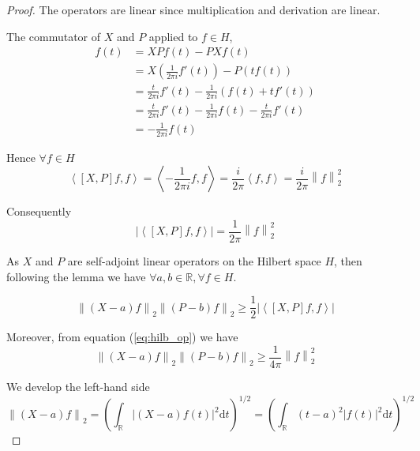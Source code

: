 \documentclass[
  american,
]{article}
\begin{document}
\begin{proof}
The operators are linear since multiplication and derivation are linear.

The commutator of \(X\) and \(P\) applied to \(f\in H\),
\begin{align*}
[X,P]f(t) &= XPf(t) - PXf(t)\\
    &= X\left(\frac{1}{2\pi i}f'(t)\right) - P\left(tf(t)\right)\\
    &= \frac{t}{2\pi i}f'(t) - \frac{1}{2\pi i}\left(f(t) + tf'(t)\right)\\
    &= \frac{t}{2\pi i}f'(t) - \frac{1}{2\pi i}f(t) - \frac{t}{2\pi i}f'(t)\\
    &= -\frac{1}{2\pi i}f(t)
\end{align*}

Hence \(\forall f\in H\)
\begin{equation}
\left\langle[X,P]f,f\right\rangle = \left\langle-\frac{1}{2\pi i}f,f\right\rangle = \frac{i}{2\pi}\left\langle f,f\right\rangle
= \frac{i}{2\pi}\left\lVert f\right\rVert_2^2
\end{equation}

Consequently
\begin{equation}\label{eq:hilb_op}
\left\lvert\left\langle[X,P]f,f\right\rangle\right\rvert = \frac{1}{2\pi}\left\lVert f\right\rVert_2^2
\end{equation}

As \(X\) and \(P\) are self-adjoint linear operators on the Hilbert space \(H\),
then following the lemma we have \(\forall a,b\in\mathbb{R},\forall f\in H\).

\begin{equation}
\left\lVert(X-a)f\right\rVert_2 \left\lVert(P-b)f\right\rVert_2 \geq \frac{1}{2}\left\lvert\left\langle[X,P]f,f\right\rangle\right\rvert
\end{equation}

Moreover, from equation (\ref{eq:hilb_op}) we have
\begin{equation}
\left\lVert(X-a)f\right\rVert_2 \left\lVert(P-b)f\right\rVert_2 \geq \frac{1}{4\pi}\left\lVert f\right\rVert_2^2
\end{equation}

We develop the left-hand side
\begin{equation}\label{eq:delta_t}
\left\lVert(X-a)f\right\rVert_2 = \left(\int_\mathbb{R}\left\lvert(X-a)f(t)\right\rvert^2\mathrm{d}t\right)^{1/2}
= \left(\int_\mathbb{R}(t-a)^2\left\lvert f(t)\right\rvert^2\mathrm{d}t\right)^{1/2}
\end{equation}


\end{proof}
\end{document}
